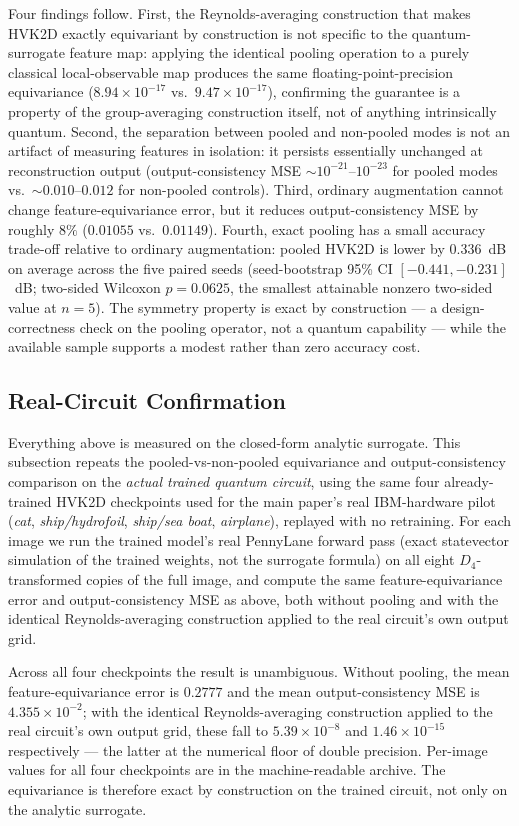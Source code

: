 \documentclass[11pt]{article}
\begin{document}
Four findings follow. First, the Reynolds-averaging construction that makes HVK2D exactly equivariant by construction is not specific to the quantum-surrogate feature map: applying the identical pooling operation to a purely classical local-observable map produces the same floating-point-precision equivariance ($8.94\times10^{-17}$ vs.\ $9.47\times10^{-17}$), confirming the guarantee is a property of the group-averaging construction itself, not of anything intrinsically quantum. Second, the separation between pooled and non-pooled modes is not an artifact of measuring features in isolation: it persists essentially unchanged at reconstruction output (output-consistency MSE $\sim10^{-21}$--$10^{-23}$ for pooled modes vs.\ $\sim0.010$--$0.012$ for non-pooled controls). Third, ordinary augmentation cannot change feature-equivariance error, but it reduces output-consistency MSE by roughly $8\%$ ($0.01055$ vs.\ $0.01149$). Fourth, exact pooling has a small accuracy trade-off relative to ordinary augmentation: pooled HVK2D is lower by $0.336$~dB on average across the five paired seeds (seed-bootstrap 95\% CI $[-0.441,-0.231]$~dB; two-sided Wilcoxon $p=0.0625$, the smallest attainable nonzero two-sided value at $n=5$). The symmetry property is exact by construction --- a design-correctness check on the pooling operator, not a quantum capability --- while the available sample supports a modest rather than zero accuracy cost.

\subsection{Real-Circuit Confirmation}
\label{sec:d4_real_circuit}
Everything above is measured on the closed-form analytic surrogate. This subsection repeats the pooled-vs-non-pooled equivariance and output-consistency comparison on the \emph{actual trained quantum circuit}, using the same four already-trained HVK2D checkpoints used for the main paper's real IBM-hardware pilot (\textit{cat}, \textit{ship/hydrofoil}, \textit{ship/sea boat}, \textit{airplane}), replayed with no retraining. For each image we run the trained model's real PennyLane forward pass (exact statevector simulation of the trained weights, not the surrogate formula) on all eight $D_4$-transformed copies of the full image, and compute the same feature-equivariance error and output-consistency MSE as above, both without pooling and with the identical Reynolds-averaging construction applied to the real circuit's own output grid.

Across all four checkpoints the result is unambiguous. Without pooling, the mean feature-equivariance error is $0.2777$ and the mean output-consistency MSE is $4.355\times10^{-2}$; with the identical Reynolds-averaging construction applied to the real circuit's own output grid, these fall to $5.39\times10^{-8}$ and $1.46\times10^{-15}$ respectively --- the latter at the numerical floor of double precision. Per-image values for all four checkpoints are in the machine-readable archive. The equivariance is therefore exact by construction on the trained circuit, not only on the analytic surrogate.
\end{document}
